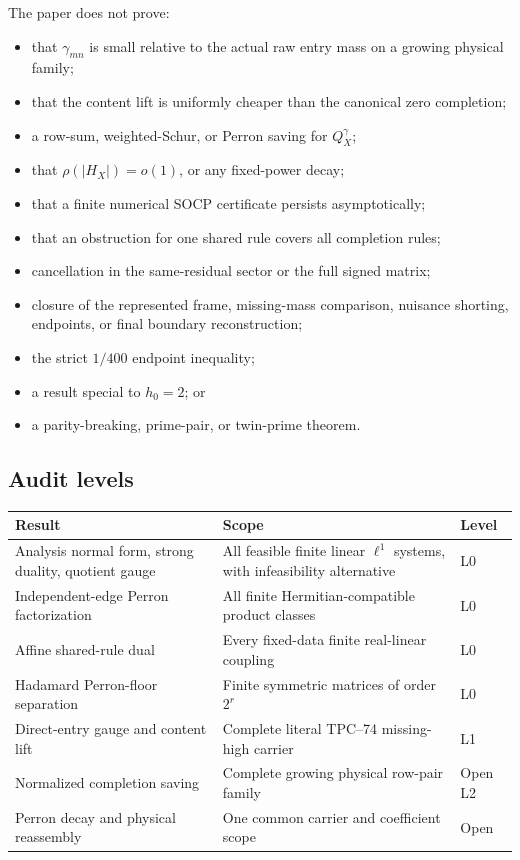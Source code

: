 The paper does not prove:
\begin{itemize}
 \item that \(\gamma_{mn}\) is small relative to the actual raw entry
       mass on a growing physical family;
 \item that the content lift is uniformly cheaper than the canonical zero
       completion;
 \item a row-sum, weighted-Schur, or Perron saving for \(Q^\gamma_X\);
 \item that \(\rho(|H_X|)=o(1)\), or any fixed-power decay;
 \item that a finite numerical SOCP certificate persists asymptotically;
 \item that an obstruction for one shared rule covers all completion
       rules;
 \item cancellation in the same-residual sector or the full signed
       matrix;
 \item closure of the represented frame, missing-mass comparison,
       nuisance shorting, endpoints, or final boundary reconstruction;
 \item the strict \(1/400\) endpoint inequality;
 \item a result special to \(h_0=2\); or
 \item a parity-breaking, prime-pair, or twin-prime theorem.
\end{itemize}

\subsection{Audit levels}

\begin{center}
\begin{tabular}{p{}p{}l}
\toprule
Result & Scope & Level\\
\midrule
Analysis normal form, strong duality, quotient gauge &
All feasible finite linear \(\ell^1\) systems, with infeasibility alternative & L0\\
Independent-edge Perron factorization &
All finite Hermitian-compatible product classes & L0\\
Affine shared-rule dual &
Every fixed-data finite real-linear coupling & L0\\
Hadamard Perron-floor separation &
Finite symmetric matrices of order \(2^r\) & L0\\
Direct-entry gauge and content lift &
Complete literal TPC--74 missing-high carrier & L1\\
Normalized completion saving &
Complete growing physical row-pair family & Open L2\\
Perron decay and physical reassembly &
One common carrier and coefficient scope & Open\\
\bottomrule
\end{tabular}
\end{center}

